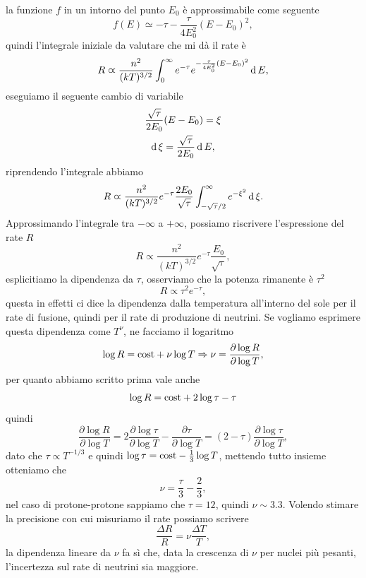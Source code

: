 la funzione $f$ in un intorno del punto $E_0$ è approssimabile come seguente
\begin{equation*}
    f(E) \simeq -\tau -\frac{\tau}{4E_0^2}(E - E_0)^2,
\end{equation*}
quindi l'integrale iniziale da valutare che mi dà il rate è 
\begin{equation*}
    R \varpropto \frac{n^2}{(kT)^{3/2}} \int_0^\infty e^{-\tau} e^{-\frac{\tau}{4E_0^2}(E-E_0)^2}\operatorname{d} E,
\end{equation*}
eseguiamo il seguente cambio di variabile
\begin{gather*}
    \frac{\sqrt{\tau}}{2E_0}(E-E_0) = \xi \\
    \operatorname{d} \xi = \frac{\sqrt{\tau}}{2E_0}\operatorname{d} E,
\end{gather*}
riprendendo l'integrale abbiamo
\begin{equation*}
    R \varpropto \frac{n^2}{(kT)^{3/2}} e^{-\tau} \frac{2E_0}{\sqrt{\tau}}\int_{-\sqrt{\tau}/2}^{\infty} e^{-\xi^2} \operatorname{d} \xi.
\end{equation*}
Approssimando l'integrale tra $-\infty$ a $+\infty$, possiamo riscrivere l'espressione del rate $R$
\begin{equation*}
    R \varpropto \frac{n^2}{(kT)^{3/2}}e^{-\tau}\frac{E_0}{\sqrt{\tau}},
\end{equation*}
esplicitiamo la dipendenza da $\tau$, osserviamo che la potenza rimanente è $\tau^2$
\begin{equation*}
    R \varpropto \tau^2 e^{-\tau},
\end{equation*}
questa in effetti ci dice la dipendenza dalla temperatura all'interno del sole per il rate di fusione, quindi per il rate di produzione di neutrini. Se vogliamo esprimere questa dipendenza come $T^{\nu}$, ne facciamo il logaritmo
\begin{equation*}
    \log R = \textup{cost} + \nu \log T \Rightarrow \nu = \frac{\partial \log R}{\partial \log T},
\end{equation*}
per quanto abbiamo scritto prima vale anche
\begin{equation*}
    \log R = \textup{cost} + 2 \log \tau - \tau
\end{equation*}
quindi
\begin{equation*}
    \frac{\partial \log R}{\partial \log T} = 2 \frac{\partial \log \tau}{\partial \log T} - \frac{\partial \tau}{\partial \log T} = (2 - \tau) \frac{\partial \log \tau}{\partial \log T},
\end{equation*}
dato che $\tau \varpropto T^{-1/3}$ e quindi $\log \tau = \textup{cost} - \frac{1}{3} \log T$, mettendo tutto insieme otteniamo che
\begin{equation*}
    \nu = \frac{\tau}{3} - \frac{2}{3},
\end{equation*}
nel caso di protone-protone sappiamo che $\tau = 12$, quindi $\nu \sim 3.3$. Volendo stimare la precisione con cui misuriamo il rate possiamo scrivere
\begin{equation*}
    \frac{\Delta R}{R} = \nu \frac{\Delta T}{T},
\end{equation*}
la dipendenza lineare da $\nu$ fa sì che, data la crescenza di $\nu$ per nuclei più pesanti, l'incertezza sul rate di neutrini sia maggiore.
